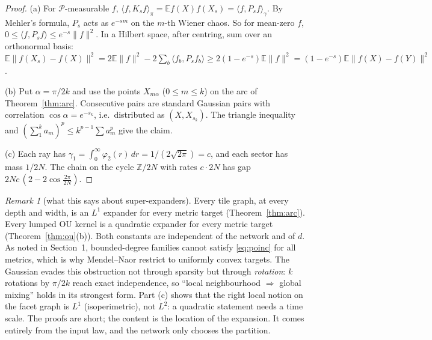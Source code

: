 \documentclass[11pt]{article}
\theoremstyle{definition}
\theoremstyle{remark}
\newtheorem{remark}[theorem]{Remark}
\newcommand{\Z}{\mathbb Z}
\newcommand{\E}{\mathbb E}
\begin{document}
\begin{proof}
(a) For $\mathcal P$-measurable $f$, $\langle f,K_sf\rangle_\pi=\E f(X)f(X_s)=\langle f,P_sf\rangle_\gamma$. By Mehler's formula, $P_s$ acts as $e^{-sm}$ on the $m$-th Wiener chaos. So for mean-zero $f$, $0\le\langle f,P_sf\rangle\le e^{-s}\|f\|^2$. In a Hilbert space, after centring, sum over an orthonormal basis: $\E\|f(X_s)-f(X)\|^2=2\E\|f\|^2-2\sum_b\langle f_b,P_sf_b\rangle\ge2(1-e^{-s})\E\|f\|^2=(1-e^{-s})\E\|f(X)-f(Y)\|^2$.

(b) Put $\alpha=\pi/2k$ and use the points $X_{m\alpha}$ ($0\le m\le k$) on the arc of Theorem~\ref{thm:arc}. Consecutive pairs are standard Gaussian pairs with correlation $\cos\alpha=e^{-s_k}$, i.e.\ distributed as $(X,X_{s_k})$. The triangle inequality and $(\sum_1^ka_m)^p\le k^{p-1}\sum a_m^p$ give the claim.

(c) Each ray has $\gamma_1=\int_0^\infty\varphi_2(r)\,dr=1/(2\sqrt{2\pi})=c$, and each sector has mass $1/2N$. The chain on the cycle $\Z/2N$ with rates $c\cdot2N$ has gap $2Nc\,(2-2\cos\frac{2\pi}{2N})$.
\end{proof}

\begin{remark}[what this says about super-expanders]
Every tile graph, at every depth and width, is an $L^1$ expander for every metric target (Theorem~\ref{thm:arc}). Every lumped OU kernel is a quadratic expander for every metric target (Theorem~\ref{thm:ou}(b)). Both constants are independent of the network and of $d$. As noted in Section~1, bounded-degree families cannot satisfy \eqref{eq:poinc} for all metrics, which is why Mendel--Naor restrict to uniformly convex targets. The Gaussian evades this obstruction not through sparsity but through \emph{rotation}: $k$ rotations by $\pi/2k$ reach exact independence, so ``local neighbourhood $\Rightarrow$ global mixing'' holds in its strongest form. Part (c) shows that the right local notion on the facet graph is $L^1$ (isoperimetric), not $L^2$: a quadratic statement needs a time scale. The proofs are short; the content is the location of the expansion. It comes entirely from the input law, and the network only chooses the partition.
\end{remark}
\end{document}
